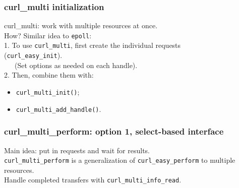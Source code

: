 \begin{frame}
  \frametitle{curl\_multi initialization}

  
    curl\_multi: work with multiple resources at once.\\[1em]

    How? Similar idea to {\tt epoll}:\\[1em]

    1. To use {\tt curl\_multi}, first create the individual requests \\ \hspace{2em} ({\tt curl\_easy\_init}).\\
    ~~~(Set options as needed on each handle).\\[1em]

    2. Then, combine them with:
    \begin{itemize}
      \item {\tt curl\_multi\_init()};
      \item {\tt curl\_multi\_add\_handle()}.
    \end{itemize}

  

\end{frame}

\begin{frame}
  \frametitle{curl\_multi\_perform: option 1, select-based interface}

  
    Main idea: put in requests and wait for results.\\[1em]

    {\tt curl\_multi\_perform} is a generalization of {\tt curl\_easy\_perform} to multiple resources.\\[1em]

    Handle completed transfers with {\tt curl\_multi\_info\_read}.

  

\end{frame}


